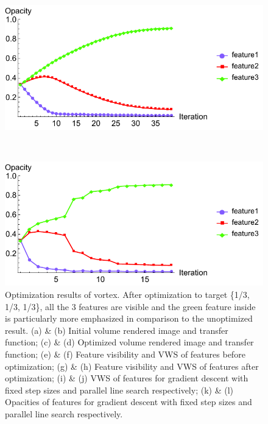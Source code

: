 \begin{figure}
	\begin{minipage}{.49\textwidth}
		\includegraphics[width=1\linewidth]{figures/vortex_naive_proportional_opacity_fixed}
		\subcaption{}
	\end{minipage}~
	\begin{minipage}{.49\textwidth}
		\includegraphics[width=1\linewidth]{figures/vortex_naive_proportional_opacity_parallelsearch}
		\subcaption{}
	\end{minipage}
	\caption[Optimization results of vortex]{Optimization results of vortex. After optimization to target \{1/3, 1/3, 1/3\}, all the 3 features are visible and the green feature inside is particularly more emphasized in comparison to the unoptimized result.
		(a) \& (b) Initial volume rendered image and transfer function; (c) \& (d) Optimized volume rendered image and transfer function; (e) \& (f) Feature visibility and VWS of features before optimization; (g) \& (h) Feature visibility and VWS of features after optimization; (i) \& (j) VWS of features for gradient descent with fixed step sizes and parallel line search respectively; (k) \& (l) Opacities of features for gradient descent with fixed step sizes and parallel line search respectively.}
	\label{fig:vortex_naive_optimized}
\end{figure}

